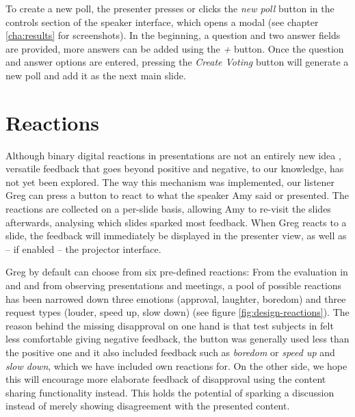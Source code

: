 To create a new poll, the presenter presses or clicks the \emph{new poll} button in the controls section of the speaker interface, which opens a modal (see chapter \ref{cha:results} for screenshots). In the beginning, a question and two answer fields are provided, more answers can be added using the \emph{+} button. Once the question and answer options are entered, pressing the \emph{Create Voting} button will generate a new poll and add it as the next main slide.

\section{Reactions}
\label{sec:design-reactions}
Although binary digital reactions in presentations are not an entirely new idea \cite{Teevan:MobileFeedbackDuringPresentation}, versatile feedback that goes beyond positive and negative, to our knowledge, has not yet been explored. The way this mechanism was implemented, our listener Greg can press a button to react to what the speaker Amy said or presented. The reactions are collected on a per-slide basis, allowing Amy to re-visit the slides afterwards, analysing which slides sparked most feedback. When Greg reacts to a slide, the feedback will immediately be displayed in the presenter view, as well as -- if enabled -- the projector interface.

Greg by default can choose from six pre-defined reactions: From the evaluation in \cite{Teevan:MobileFeedbackDuringPresentation} and \cite{Isaacs:InteractivePresentationsDistributedAudience} and from observing presentations and meetings, a pool of possible reactions has been narrowed down three emotions (approval, laughter, boredom) and three request types (louder, speed up, slow down) (see figure \ref{fig:design-reactions}). The reason behind the missing disapproval on one hand is that test subjects in \cite{Teevan:MobileFeedbackDuringPresentation} felt less comfortable giving negative feedback, the button was generally used less than the positive one and it also included feedback such as \emph{boredom} or \emph{speed up} and \emph{slow down}, which we have included own reactions for. On the other side, we hope this will encourage more elaborate feedback of disapproval using the content sharing functionality instead. This holds the potential of sparking a discussion instead of merely showing disagreement with the presented content.

